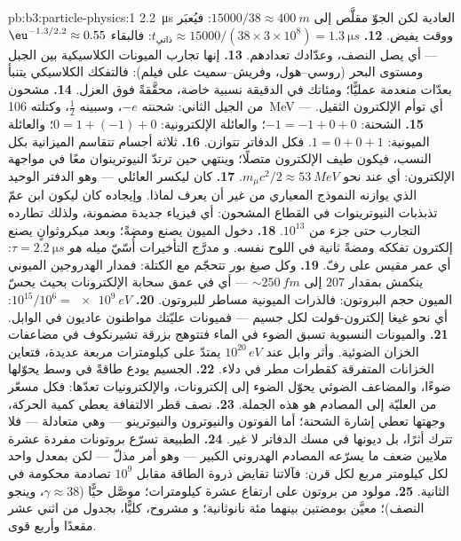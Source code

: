 \begin{solution}{pb:b3:particle-physics:1}
\qty{2.2}{\micro s} العادية لكن الجوّ مقلَّص إلى
$15000/38 \approx \qty{400}{m}$: فيُعبَر ووقت يفيض.
\textbf{12.} $t_{\text{ذاتي}} \approx 15000/(38\times3\times
10^8) = \qty{1.3}{\micro s}$: فالبقاء $\eu^{-1.3/2.2} \approx
0.55$ --- أي يصل النصف، وعدّادك تعدادهم.
\textbf{13.} إنها تجارب الميونات الكلاسيكية بين الجبل ومستوى البحر
(روسي--هول، وفريش--سميث على فيلم): فالتفكك
الكلاسيكي يتنبأ بعدّات منعدمة عمليًّا؛ ومئاتك في
الدقيقة نسبية خاصة، محقَّقةً فوق العزل.
\textbf{14.}  مشحون من الجيل الثاني:
شحنته $-e$، وسبينه $\tfrac12$، وكتلته \qty{106}{MeV} --- أي
توأم الإلكترون الثقيل.
\textbf{15.} الشحنة: $-1 = -1 + 0 + 0$؛ والعائلة الإلكترونية:
$0 = 1 + (-1) + 0$؛ والعائلة الميونية: $1 = 0 + 0 + 1$. فكل الدفاتر
تتوازن.
\textbf{16.} ثلاثة أجسام تتقاسم الميزانية بكل النسب،
فيكون طيف الإلكترون متصلًا؛ وينتهي حين ترتدّ النيوترينوان
معًا في مواجهة الإلكترون: أي عند نحو
$m_\mu c^2/2 \approx \qty{53}{MeV}$.
\textbf{17.} كان ليكسر  العائلي --- وهو الدفتر
الوحيد الذي يوازنه النموذج المعياري من غير أن يعرف لماذا. وإيجاده
كان ليكون ابن عمّ تذبذبات النيوترينوات في القطاع المشحون:
أي فيزياء جديدة مضمونة، ولذلك تطارده التجارب حتى
جزء من $10^{13}$.
\textbf{18.} دخول الميون يصنع ومضةً؛ وبعد ميكروثوانٍ
يصنع إلكترون تفككه ومضةً ثانية في اللوح نفسه. و
مدرَّج التأخيرات أُسّيّ ميله \emph{هو}
$\tau = \qty{2.2}{\micro s}$: أي عمر مقيس على رفّ.
\textbf{19.} وكل صيغ بور تتحجّم مع الكتلة: فمدار الهدروجين
الميوني ينكمش بمقدار $207$ إلى ${\sim}\qty{250}{fm}$ ---
أي في عمق سحابة الإلكترونات بحيث يحسّ الميون
حجم البروتون: فالذرات الميونية مساطر للبروتون.
\textbf{20.} $10^{15}/10^{6} = \qty{e9}{eV}$: أي نحو غيغا إلكترون-فولت لكل
جسيم --- فميونات عليّتك مواطنون عاديون في الوابل.
\textbf{21.} والميونات النسبوية تسبق الضوء في الماء فتتوهج
بزرقة تشيرنكوف في مضاعفات الخزان الضوئية. وأثر وابل عند
$10^{20}\,\unit{eV}$ يمتدّ على كيلومترات مربعة
عديدة، فتعاين الخزانات المتفرقة كقطرات مطر في
دلاء.
\textbf{22.} الجسيم يودع طاقةً في وسط
يحوّلها ضوءًا، والمضاعف الضوئي يحوّل الضوء إلى
إلكترونات، والإلكترونيات تعدّها: فكل مسعّر من
العليّة إلى المصادم هو هذه الجملة.
\textbf{23.} نصف قطر الالتفافة يعطي كمية الحركة، وجهتها تعطي
إشارة الشحنة؛ أما الفوتون والنيوترون والنيوترينو ---
وهي متعادلة --- فلا تترك أثرًا، بل ديونها في
مسك الدفاتر لا غير.
\textbf{24.} الطبيعة تسرّع بروتونات مفردة عشرة ملايين
ضعف ما يسرّعه المصادم الهدروني الكبير --- وهو أمر مذلّ --- لكن بمعدل واحد لكل كيلومتر
مربع لكل قرن: فآلاتنا تقايض ذروة الطاقة مقابل
$10^{9}$ تصادمة محكومة في الثانية.
\textbf{25.} مولود من بروتون على ارتفاع عشرة كيلومترات؛ موصَّل
حيًّا  ($\gamma \approx 38$، وينجو النصف)؛
معيَّن بومضتين بينهما مئة نانوثانية؛ و
مشروح، كليًّا، بجدول من اثني عشر مقعدًا وأربع
قوى.
\end{solution}
